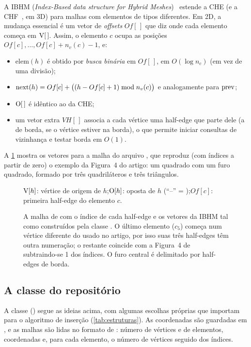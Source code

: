 A IBHM (\emph{Index-Based data structure for Hybrid Meshes})~\cite{ibhm} estende a CHE (e a CHF~\cite{chf}, em 3D) para
malhas com elementos de tipos diferentes. Em 2D, a mudança essencial é um vetor de \emph{offsets} $Of[\,]$ que diz onde
cada elemento começa em $\mathrm{V}[\,]$. Assim, o elemento $c$ ocupa as posições $Of[c],\dots,Of[c]+n_v(c)-1$, e:
\begin{itemize}
\item $\mathrm{elem}(h)$ é obtido por \emph{busca binária} em $Of[\,]$, em $O(\log n_c)$ (em vez de uma divisão);
\item $\mathrm{next}(h)=Of[c]+\big((h-Of[c]+1)\bmod n_v(c)\big)$ e analogamente para $\mathrm{prev}$;
\item $\mathrm{O}[\,]$ é idêntico ao da CHE;
\item um vetor extra $VH[\,]$ associa a cada vértice uma half-edge que parte dele (a de borda, se o vértice estiver na
borda), o que permite iniciar consultas de vizinhança e testar borda em $O(1)$.
\end{itemize}
A \cref{fig:ibhm} mostra os vetores para a malha do arquivo , que reproduz (com índices a partir de
zero) o exemplo da Figura~4 do artigo: um quadrado com um furo quadrado, formado por três quadriláteros e três
triângulos.

\begin{figure}[ht]
\centering

\par\medskip
{\footnotesize\setlength{\tabcolsep}{2.2pt}}
\par\smallskip
{\small $\mathrm{V}[h]$: vértice de origem de $h$;\quad $\mathrm{O}[h]$: oposta de $h$ (``--'' = \BORDER);\quad $Of[c]$: primeira
half-edge do elemento $c$.}
\caption{A malha de  com o índice de cada half-edge e os vetores da IBHM tal como construídos pela
classe . O último elemento ($c_5$) começa num vértice diferente do usado no artigo, por isso suas três
half-edges têm outra numeração; o restante coincide com a Figura~4 de~\cite{ibhm} subtraindo-se 1 dos índices. O furo
central é delimitado por half-edges de borda.}
\label{fig:ibhm}
\end{figure}

\subsection{A classe  do repositório}
\label{sec:impl-estruturas}

A classe  () segue as ideias acima, com algumas escolhas
próprias que importam para o algoritmo de inserção (\cref{tab:estruturas}). As coordenadas são guardadas em
, e as malhas são lidas no formato de : número de vértices e de elementos, coordenadas e,
para cada elemento, o número de vértices seguido dos índices.

